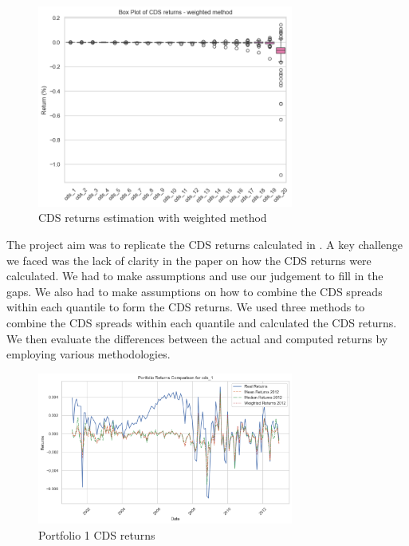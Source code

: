 \documentclass{article}
\begin{document}
\begin{figure}[H]
    \centering
    \includegraphics[width=0.75\textwidth]{../assets/cds_returns_boxplots_weighted.png}
    \caption{\label{fig:returns_box_plot_weighted}CDS returns estimation with weighted method}
    \end{figure}       

The project aim was to replicate the CDS returns calculated in \cite{kelly2017}. A key challenge we faced was the lack of clarity in the paper on how the CDS returns were calculated. We had to make assumptions and use our judgement to fill in the gaps. We also had to make assumptions on how to combine the CDS spreads within each quantile to form the CDS returns. We used three methods to combine the CDS spreads within each quantile and calculated the CDS returns. We then evaluate the differences between the actual and computed returns by employing various methodologies. 

\begin{figure}[H]
    \centering
    \includegraphics[width=0.75\textwidth]{../assets/returns_cds1_insample.png}
    \caption{\label{fig:cds_rets_p1}Portfolio 1 CDS returns}
    \end{figure}
\end{document}
